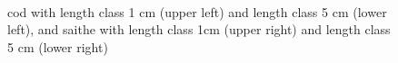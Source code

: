 \documentclass[a4paper 12pt]{article}
\numberwithin{equation}{section}
\begin{document}
\begin{figure}[h!]
    \centering
{}
    \hfill
{}

    \hfill
{}\
    \caption{cod with length class 1 cm (upper left) and length class 5 cm (lower left), and saithe with length class 1cm (upper right) and length class 5 cm (lower right)}
    \label{fig:trawlhauls}
\end{figure}
\end{document}

